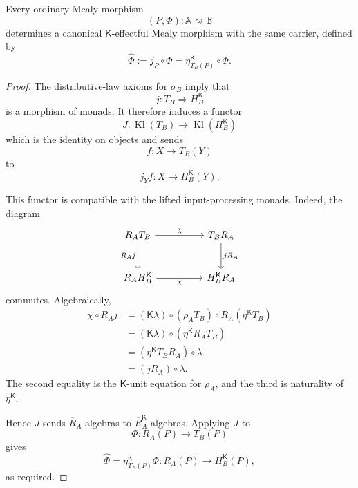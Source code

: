 \begin{proposition}
\label{prop:pure-effectful-mealy-morphisms}
    Every ordinary Mealy morphism
    \[
        (P,\Phi):
        \mathbb A\rightsquigarrow\mathbb B
    \]
    determines a canonical \(\mathsf K\)-effectful Mealy morphism with the
    same carrier, defined by
    \[
        \widehat\Phi
        :=
        j_P\circ\Phi
        =
        \eta^{\mathsf K}_{T_B(P)}
        \circ
        \Phi.
    \]
\end{proposition}
\begin{proof}
    The distributive-law axioms for \(\sigma_B\) imply that
    \[
        j:
        T_B\Rightarrow H_B^{\mathsf K}
    \]
    is a morphism of monads. It therefore induces a functor
    \[
        J:
        \operatorname{Kl}(T_B)
        \longrightarrow
        \operatorname{Kl}(H_B^{\mathsf K})
    \]
    which is the identity on objects and sends
    \[
        f:X\to T_B(Y)
    \]
    to
    \[
        j_Yf:
        X\to H_B^{\mathsf K}(Y).
    \]

    This functor is compatible with the lifted input-processing monads. Indeed,
    the diagram
    \[
        \begin{tikzcd}[column sep=huge, row sep=large]
                R_AT_B
                    \arrow[r, "\lambda"]
                    \arrow[d, "R_Aj"']
            &
                T_BR_A
                    \arrow[d, "jR_A"]
            \\
                R_AH_B^{\mathsf K}
                    \arrow[r, "\chi"']
            &
                H_B^{\mathsf K}R_A
        \end{tikzcd}
    \]
    commutes. Algebraically,
    \[
    \begin{aligned}
        \chi\circ R_Aj
        &=
        (\mathsf K\lambda)
        \circ
        (\rho_AT_B)
        \circ
        R_A(\eta^{\mathsf K}T_B)
        \\
        &=
        (\mathsf K\lambda)
        \circ
        (\eta^{\mathsf K}R_AT_B)
        \\
        &=
        (\eta^{\mathsf K}T_BR_A)
        \circ
        \lambda
        \\
        &=
        (jR_A)\circ\lambda.
    \end{aligned}
    \]
    The second equality is the \(\mathsf K\)-unit equation for \(\rho_A\),
    and the third is naturality of \(\eta^{\mathsf K}\).

    Hence \(J\) sends \(\overline R_A\)-algebras to
    \(\overline R_A^{\mathsf K}\)-algebras. Applying \(J\) to
    \[
        \Phi:
        R_A(P)\to T_B(P)
    \]
    gives
    \[
        \widehat\Phi
        =
        \eta^{\mathsf K}_{T_B(P)}\Phi:
        R_A(P)\to H_B^{\mathsf K}(P),
    \]
    as required.
\end{proof}

